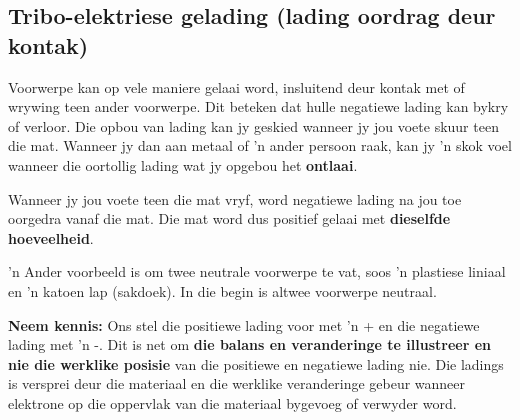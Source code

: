 \subsection{Tribo-elektriese gelading (lading oordrag deur kontak)}
\nopagebreak
Voorwerpe kan op vele maniere gelaai word, insluitend deur kontak met of wrywing teen ander voorwerpe. Dit beteken dat hulle negatiewe lading kan bykry of verloor. Die opbou van lading kan jy geskied wanneer jy jou voete skuur teen die mat. Wanneer jy dan aan metaal of 'n ander persoon raak, kan jy 'n skok voel wanneer die oortollig lading wat jy opgebou het \textbf{ontlaai}.\par


Wanneer jy jou voete teen die mat vryf, word negatiewe lading na jou toe oorgedra vanaf die mat. Die mat word dus positief gelaai met \textbf{dieselfde hoeveelheid}. \par
      

 'n Ander voorbeeld is om twee neutrale voorwerpe te vat, soos 'n plastiese liniaal en 'n katoen lap (sakdoek). In die begin is altwee voorwerpe neutraal.\par
      
\textbf{Neem kennis:} Ons stel die positiewe lading voor met 'n {\red +} en die negatiewe lading met 'n -. Dit is net om \textbf{die balans en veranderinge te illustreer en nie die werklike posisie } van die positiewe en negatiewe lading nie. Die ladings is versprei deur die materiaal en die werklike veranderinge gebeur wanneer elektrone op die oppervlak van die materiaal bygevoeg of verwyder word. 


